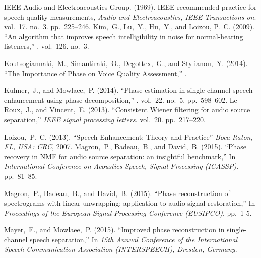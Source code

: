  IEEE Audio and Electroacoustics Group. (1969).
\newblock IEEE recommended practice for speech quality measurements, \newblock
{\em Audio and Electroacoustics, IEEE Transactions on}. vol.~17. no.~3. pp.~225--246.
 Kim,~G., Lu,~Y., Hu,~Y., and Loizou, P.~C. (2009).
\newblock ``An algorithm that improves speech intelligibility in noise for
normal-hearing listeners,'' . vol.~126. no.~3.

 Koutsogiannaki,~M., Simantiraki,~O.,
Degottex,~G., and Stylianou,~Y. (2014). ``The Importance of Phase on
Voice Quality Assessment,'' .

 Kulmer,~J., and
Mowlaee,~P. (2014). \newblock ``Phase estimation in single channel speech enhancement
using phase decomposition,'' .
vol.~22. no.~5. pp.~598--602.
%
  Le Roux,~J., and Vincent,~E. (2013).
\newblock ``Consistent Wiener filtering for audio source separation,'' \newblock
{\em IEEE signal processing letters}. vol.~20. pp.~217--220.

 Loizou,~P.~C. (2013).
\newblock ``Speech Enhancement: Theory and Practice'' \newblock
{\em Boca Raton, FL, USA: CRC}, 2007.
  Magron,~P., Badeau,~B., and David,~B. (2015).
\newblock ``Phase recovery in \textsc{NMF} for audio source separation: an
insightful benchmark,'' \newblock In {\em International Conference on Acoustics
Speech, Signal Processing (ICASSP)}. pp.~81--85.

 Magron,~P., Badeau,~B., and David,~B. (2015).
\newblock ``Phase reconstruction of spectrograms with linear unwrapping:
application to audio signal restoration,'' \newblock In {\em Proceedings of the European Signal Processing Conference (EUSIPCO)}, pp.~1-5.

 Mayer,~F., and Mowlaee,~P. (2015). \newblock
``Improved phase reconstruction in single-channel speech separation,'' \newblock In
{\em 15th Annual Conference of the International Speech Communication
Association {(INTERSPEECH)}, Dresden, Germany}.

